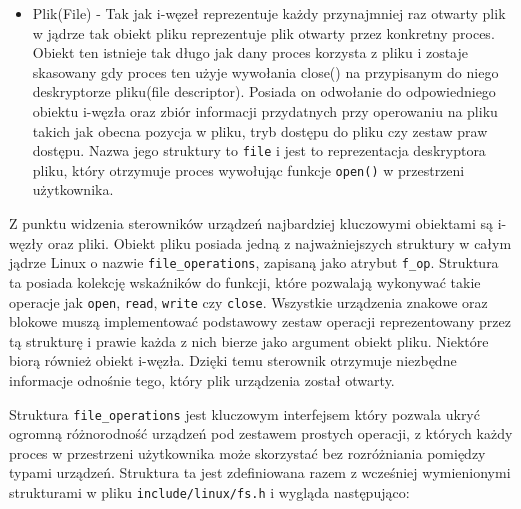 \documentclass[10pt]{scrartcl}
\begin{document}
\begin{itemize}
\item
  Plik(File) - Tak jak i-węzeł reprezentuje każdy przynajmniej raz otwarty plik w jądrze tak obiekt pliku reprezentuje plik otwarty przez konkretny proces. Obiekt ten istnieje tak długo jak dany proces korzysta z pliku i zostaje skasowany gdy proces ten użyje wywołania close() na przypisanym do niego deskryptorze pliku(file descriptor). Posiada on odwołanie do odpowiedniego obiektu i-węzła oraz zbiór informacji przydatnych przy operowaniu na pliku takich jak obecna pozycja w pliku, tryb dostępu do pliku czy zestaw praw dostępu. Nazwa jego struktury to \texttt{file} i jest to reprezentacja deskryptora pliku, który otrzymuje proces wywołując funkcje \texttt{open()} w przestrzeni użytkownika.
\end{itemize}

Z punktu widzenia sterowników urządzeń najbardziej kluczowymi obiektami są i-węzły oraz pliki. Obiekt pliku posiada jedną z najważniejszych struktury w całym jądrze Linux o nazwie \texttt{file\_operations}, zapisaną jako atrybut \texttt{f\_op}. Struktura ta posiada kolekcję wskaźników do funkcji, które pozwalają wykonywać takie operacje jak \texttt{open}, \texttt{read}, \texttt{write} czy \texttt{close}. Wszystkie urządzenia znakowe oraz blokowe muszą implementować podstawowy zestaw operacji reprezentowany przez tą strukturę i prawie każda z nich bierze jako argument obiekt pliku. Niektóre biorą również obiekt i-węzła. Dzięki temu sterownik otrzymuje niezbędne informacje odnośnie tego, który plik urządzenia został otwarty.

Struktura \texttt{file\_operations} jest kluczowym interfejsem który pozwala ukryć ogromną różnorodność urządzeń pod zestawem prostych operacji, z których każdy proces w przestrzeni użytkownika może skorzystać bez rozróżniania pomiędzy typami urządzeń. Struktura ta jest zdefiniowana razem z wcześniej wymienionymi strukturami w pliku \texttt{include/linux/fs.h} i wygląda następująco:
\end{document}
